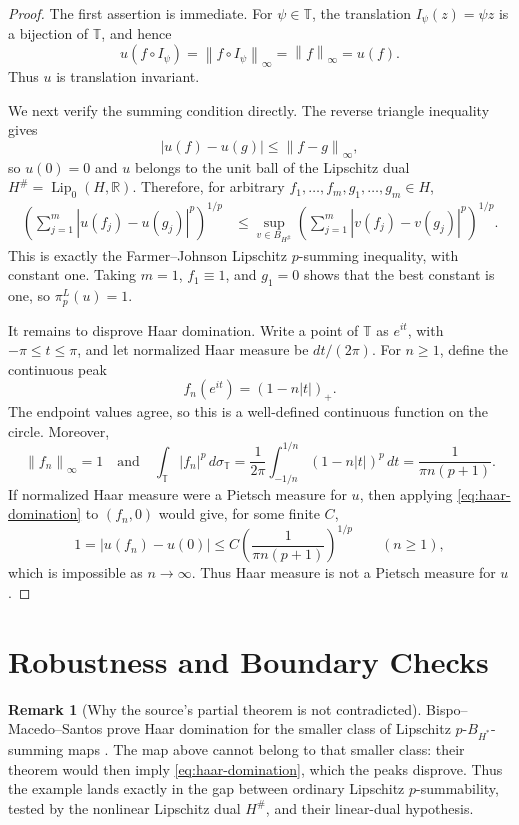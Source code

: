 \documentclass[11pt]{article}
\theoremstyle{definition}
\newtheorem{remark}{Remark}
\newcommand{\T}{\mathbb T}
\newcommand{\R}{\mathbb R}
\newcommand{\Lip}{\operatorname{Lip}}
\newcommand{\norm}[1]{\left\lVert #1\right\rVert}
\begin{document}
\begin{proof}
The first assertion is immediate.  For \(\psi\in\T\), the translation
\(I_\psi(z)=\psi z\) is a bijection of \(\T\), and hence
\[
 u(f\circ I_\psi)=\norm{f\circ I_\psi}_\infty
 =\norm{f}_\infty=u(f).
\]
Thus \(u\) is translation invariant.

We next verify the summing condition directly.  The reverse triangle
inequality gives
\[
 |u(f)-u(g)|\le \norm{f-g}_\infty,
\]
so \(u(0)=0\) and \(u\) belongs to the unit ball of the Lipschitz dual
\(H^\#=\Lip_0(H,\R)\).  Therefore, for arbitrary
\(f_1,\ldots,f_m,g_1,\ldots,g_m\in H\),
\begin{align*}
 \left(\sum_{j=1}^m |u(f_j)-u(g_j)|^p\right)^{1/p}
 &\le
 \sup_{v\in B_{H^\#}}
 \left(\sum_{j=1}^m |v(f_j)-v(g_j)|^p\right)^{1/p}.
\end{align*}
This is exactly the Farmer--Johnson Lipschitz \(p\)-summing inequality, with
constant one.  Taking \(m=1\), \(f_1\equiv1\), and \(g_1=0\) shows that the
best constant is one, so \(\pi_p^L(u)=1\).

It remains to disprove Haar domination.  Write a point of \(\T\) as
\(e^{it}\), with \(-\pi\le t\le\pi\), and let normalized Haar measure be
\(dt/(2\pi)\).  For \(n\ge1\), define the continuous peak
\[
 f_n(e^{it})=(1-n|t|)_+.
\]
The endpoint values agree, so this is a well-defined continuous function on
the circle.  Moreover,
\[
 \norm{f_n}_\infty=1
 \quad\text{and}\quad
 \int_\T |f_n|^p\,d\sigma_\T
 =\frac1{2\pi}\int_{-1/n}^{1/n}(1-n|t|)^p\,dt
 =\frac1{\pi n(p+1)}.
\]
If normalized Haar measure were a Pietsch measure for \(u\), then applying
\eqref{eq:haar-domination} to \((f_n,0)\) would give, for some finite \(C\),
\[
 1=|u(f_n)-u(0)|
 \le C\left(\frac1{\pi n(p+1)}\right)^{1/p}
 \qquad(n\ge1),
\]
which is impossible as \(n\to\infty\).  Thus Haar measure is not a Pietsch
measure for \(u\).
\end{proof}

\section{Robustness and Boundary Checks}

\begin{remark}[Why the source's partial theorem is not contradicted]
Bispo--Macedo--Santos prove Haar domination for the smaller class of
Lipschitz \(p\)-\(B_{H^*}\)-summing maps \cite[Theorem 4.3]{BMS}.  The map
above cannot belong to that smaller class: their theorem would then imply
\eqref{eq:haar-domination}, which the peaks disprove.  Thus the example lands
exactly in the gap between ordinary Lipschitz \(p\)-summability, tested by
the nonlinear Lipschitz dual \(H^\#\), and their linear-dual hypothesis.
\end{remark}
\end{document}
